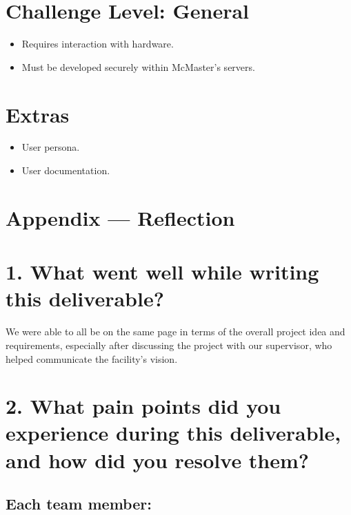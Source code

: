 \documentclass{article}
\begin{document}
\section*{Challenge Level: General}

\begin{itemize}
    \item Requires interaction with hardware.
    \item Must be developed securely within McMaster’s servers.
\end{itemize}

\section*{Extras}

\begin{itemize}
    \item User persona.
    \item User documentation.
\end{itemize}

\newpage{}

\section*{Appendix --- Reflection}




  

\section*{1. What went well while writing this deliverable?}
We were able to all be on the same page in terms of the overall project idea and requirements, especially after discussing the project with our supervisor, who helped communicate the facility’s vision.

\section*{2. What pain points did you experience during this deliverable, and how did you resolve them?}

\subsection*{Each team member:}
\end{document}
